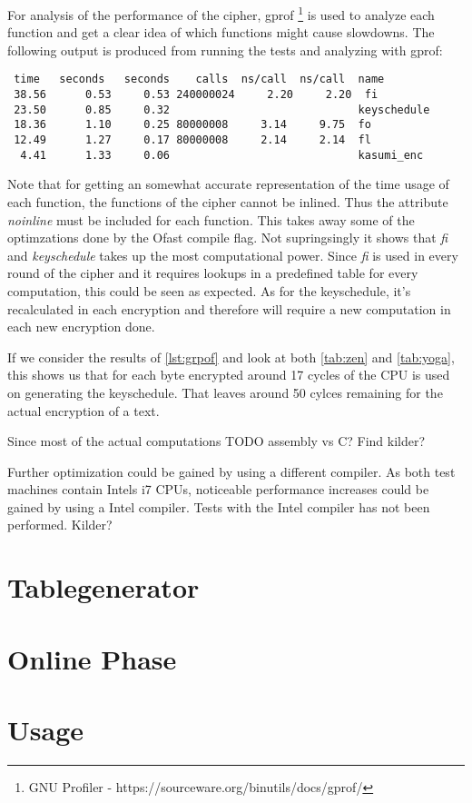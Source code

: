 For analysis of the performance of the cipher, gprof \footnote{GNU
  Profiler - https://sourceware.org/binutils/docs/gprof/} is used to
analyze each function and get a clear idea of which functions might
cause slowdowns. The following output is produced from running the
tests and analyzing with gprof:
\begin{lstlisting}[caption=Gprof output,captionpos=b,label=lst:grpof]
    %   cumulative   self              self     total           
 time   seconds   seconds    calls  ns/call  ns/call  name    
 38.56      0.53     0.53 240000024     2.20     2.20  fi
 23.50      0.85     0.32                             keyschedule
 18.36      1.10     0.25 80000008     3.14     9.75  fo
 12.49      1.27     0.17 80000008     2.14     2.14  fl
  4.41      1.33     0.06                             kasumi_enc
\end{lstlisting}
Note that for getting an somewhat accurate representation of the time usage of
each function, the functions of the cipher cannot be inlined. Thus the
attribute \textit{noinline} must be included for each function. This
takes away some of the optimzations done by the Ofast compile
flag. Not supringsingly it shows that \textit{fi} and
\textit{keyschedule} takes up the most computational
power. Since \textit{fi} is used in every round of the cipher and it
requires lookups in a predefined table for every computation, this
could be seen as expected. As for the keyschedule, it's recalculated
in each encryption and therefore will require a new computation in
each new encryption done. 

If we consider the results of \ref{lst:grpof} and look at both
\ref{tab:zen} and \ref{tab:yoga}, this shows us that for each byte
encrypted around 17 cycles of the CPU is used on generating the
keyschedule. That leaves around 50 cylces remaining for the actual
encryption of a text.

Since most of the actual computations TODO assembly vs C? Find kilder?

Further optimization could be gained by using a different compiler. As
both test machines contain Intels i7 CPUs, noticeable performance
increases could be gained by using a Intel compiler. Tests with the
Intel compiler has not been performed. Kilder?

\section{Tablegenerator}

\section{Online Phase}

\section{Usage}


